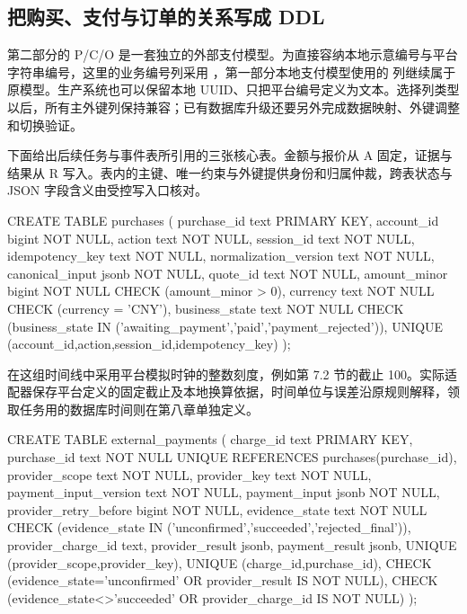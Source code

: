 \subsection*{把购买、支付与订单的关系写成 DDL}

第二部分的 P/C/O 是一套独立的外部支付模型。为直接容纳本地示意编号与平台字符串编号，这里的业务编号列采用 ，第一部分本地支付模型使用的  列继续属于原模型。生产系统也可以保留本地 UUID、只把平台编号定义为文本。选择列类型以后，所有主外键列保持兼容；已有数据库升级还要另外完成数据映射、外键调整和切换验证。

下面给出后续任务与事件表所引用的三张核心表。金额与报价从 A 固定，证据与结果从 R 写入。表内的主键、唯一约束与外键提供身份和归属仲裁，跨表状态与 JSON 字段含义由受控写入口核对。

\begin{BookCode}
CREATE TABLE purchases (
  purchase_id text PRIMARY KEY,
  account_id bigint NOT NULL, action text NOT NULL,
  session_id text NOT NULL, idempotency_key text NOT NULL,
  normalization_version text NOT NULL, canonical_input jsonb NOT NULL,
  quote_id text NOT NULL,
  amount_minor bigint NOT NULL CHECK (amount_minor > 0),
  currency text NOT NULL CHECK (currency = 'CNY'),
  business_state text NOT NULL
    CHECK (business_state IN ('awaiting_payment','paid','payment_rejected')),
  UNIQUE (account_id,action,session_id,idempotency_key)
);
\end{BookCode}

 在这组时间线中采用平台模拟时钟的整数刻度，例如第 7.2 节的截止 100。实际适配器保存平台定义的固定截止及本地换算依据，时间单位与误差沿原规则解释，领取任务用的数据库时间则在第八章单独定义。

\begin{BookCode}
CREATE TABLE external_payments (
  charge_id text PRIMARY KEY,
  purchase_id text NOT NULL UNIQUE REFERENCES purchases(purchase_id),
  provider_scope text NOT NULL, provider_key text NOT NULL,
  payment_input_version text NOT NULL, payment_input jsonb NOT NULL,
  provider_retry_before bigint NOT NULL,
  evidence_state text NOT NULL
    CHECK (evidence_state IN ('unconfirmed','succeeded','rejected_final')),
  provider_charge_id text, provider_result jsonb, payment_result jsonb,
  UNIQUE (provider_scope,provider_key),
  UNIQUE (charge_id,purchase_id),
  CHECK (evidence_state='unconfirmed' OR provider_result IS NOT NULL),
  CHECK (evidence_state<>'succeeded' OR provider_charge_id IS NOT NULL)
);
\end{BookCode}

